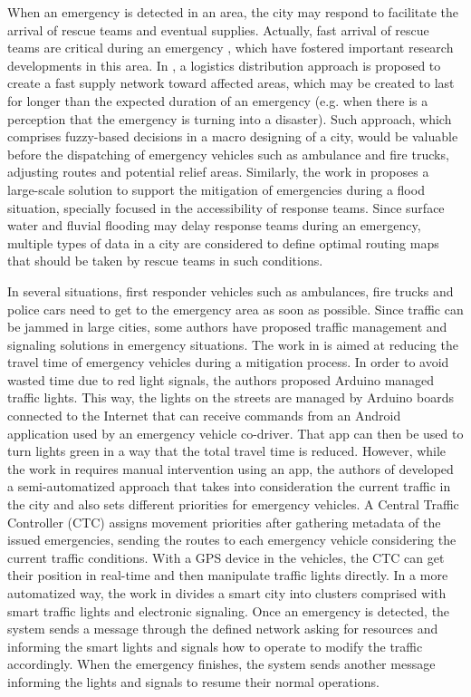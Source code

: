 \begin{refsection}
When an emergency is detected in an area, the city may respond to facilitate the arrival of rescue teams and eventual supplies. Actually, fast arrival of rescue teams are critical during an emergency \cite{mitigationurban3}, which have fostered important research developments in this area. In \cite{mitigationurban1}, a logistics distribution approach is proposed to create a fast supply network toward affected areas, which may be created to last for longer than the expected duration of an emergency (e.g. when there is a perception that the emergency is turning into a disaster). Such approach, which comprises fuzzy-based decisions in a macro designing of a city, would be valuable before the dispatching of emergency vehicles such as ambulance and fire trucks, adjusting routes and potential relief areas. Similarly, the work in \cite{mitigationurban3} proposes a large-scale solution to support the mitigation of emergencies during a flood situation, specially focused in the accessibility of response teams. Since surface water and fluvial flooding may delay response teams during an emergency, multiple types of data in a city are considered to define optimal routing maps that should be taken by rescue teams in such conditions.

In several situations, first responder vehicles such as ambulances, fire trucks and police cars need to get to the emergency area as soon as possible. Since traffic can be jammed in large cities, some authors have proposed traffic management and signaling solutions in emergency situations. The work in \cite{mitigationurban4} is aimed at reducing the travel time of emergency vehicles during a mitigation process. In order to avoid wasted time due to red light signals, the authors proposed Arduino managed traffic lights. This way, the lights on the streets are managed by Arduino boards connected to the Internet that can receive commands from an Android application used by an emergency vehicle co-driver. That app can then be used to turn lights green in a way that the total travel time is reduced. However, while the work in \cite{mitigationurban4} requires manual intervention using an app, the authors of \cite{mitigationurban5} developed a semi-automatized approach that takes into consideration the current traffic in the city and also sets different priorities for emergency vehicles. A Central Traffic Controller (CTC) assigns movement priorities after gathering metadata of the issued emergencies, sending the routes to each emergency vehicle considering the current traffic conditions. With a GPS device in the vehicles, the CTC can get their position in real-time and then manipulate traffic lights directly. In a more automatized way, the work in \cite{rego2018software} divides a smart city into clusters comprised with smart traffic lights and electronic signaling. Once an emergency is detected, the system sends a message through the defined network asking for resources and informing the smart lights and signals how to operate to modify the traffic accordingly. When the emergency finishes, the system sends another message informing the lights and signals to resume their normal operations. 


\end{refsection}
